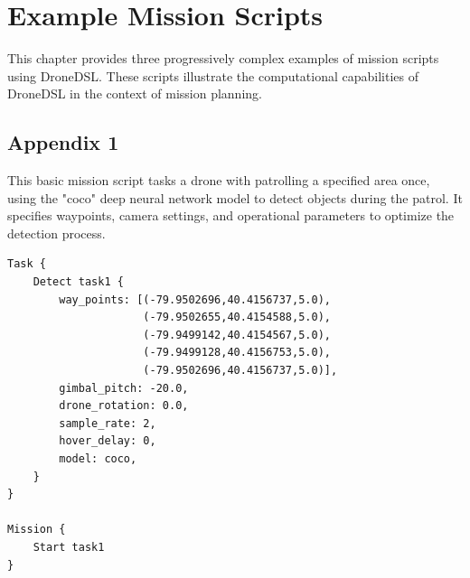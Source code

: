 \chapter{Example Mission Scripts}

This chapter provides three progressively complex examples of mission scripts using DroneDSL. These scripts illustrate the computational capabilities of DroneDSL in the context of mission planning.

\section{Appendix 1}
This basic mission script tasks a drone with patrolling a specified area once, using the "coco" deep neural network model to detect objects during the patrol. It specifies waypoints, camera settings, and operational parameters to optimize the detection process.
\begin{lstlisting}[style=customgo]
Task {
    Detect task1 {
        way_points: [(-79.9502696,40.4156737,5.0),
                     (-79.9502655,40.4154588,5.0),
                     (-79.9499142,40.4154567,5.0),
                     (-79.9499128,40.4156753,5.0),
                     (-79.9502696,40.4156737,5.0)],
        gimbal_pitch: -20.0,
        drone_rotation: 0.0,
        sample_rate: 2,
        hover_delay: 0,
        model: coco,
    }
}

Mission {
    Start task1
}
\end{lstlisting}


